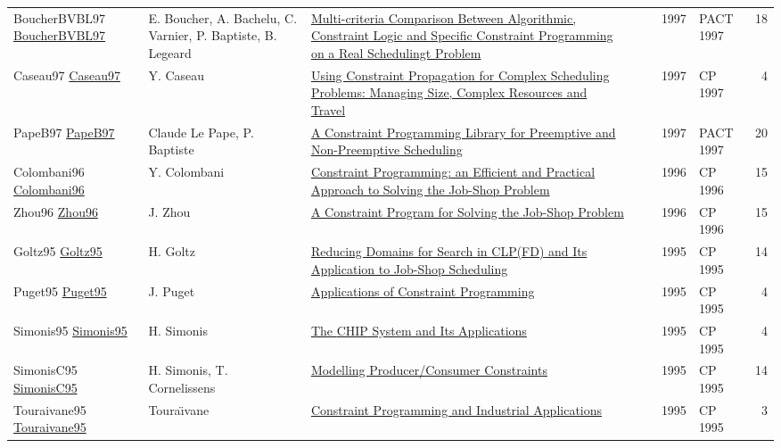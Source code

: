 {\begin{longtable}{p{3cm}p{6cm}p{7cm}rrrp{3cm}r}
BoucherBVBL97 \href{}{BoucherBVBL97} & E. Boucher, A. Bachelu, C. Varnier, P. Baptiste, B. Legeard & \href{}{Multi-criteria Comparison Between Algorithmic, Constraint Logic and Specific Constraint Programming on a Real Schedulingt Problem} &  & \cite{BoucherBVBL97} & 1997 & PACT 1997 & 18\\
Caseau97 \href{https://doi.org/10.1007/BFb0017437}{Caseau97} & Y. Caseau & \href{papers/Caseau97.pdf}{Using Constraint Propagation for Complex Scheduling Problems: Managing Size, Complex Resources and Travel} &  & \cite{Caseau97} & 1997 & CP 1997 & 4\\
PapeB97 \href{}{PapeB97} & Claude Le Pape, P. Baptiste & \href{}{A Constraint Programming Library for Preemptive and Non-Preemptive Scheduling} &  & \cite{PapeB97} & 1997 & PACT 1997 & 20\\
Colombani96 \href{https://doi.org/10.1007/3-540-61551-2\_72}{Colombani96} & Y. Colombani & \href{papers/Colombani96.pdf}{Constraint Programming: an Efficient and Practical Approach to Solving the Job-Shop Problem} &  & \cite{Colombani96} & 1996 & CP 1996 & 15\\
Zhou96 \href{https://doi.org/10.1007/3-540-61551-2\_97}{Zhou96} & J. Zhou & \href{papers/Zhou96.pdf}{A Constraint Program for Solving the Job-Shop Problem} &  & \cite{Zhou96} & 1996 & CP 1996 & 15\\
Goltz95 \href{https://doi.org/10.1007/3-540-60299-2\_33}{Goltz95} & H. Goltz & \href{papers/Goltz95.pdf}{Reducing Domains for Search in {CLP(FD)} and Its Application to Job-Shop Scheduling} &  & \cite{Goltz95} & 1995 & CP 1995 & 14\\
Puget95 \href{https://doi.org/10.1007/3-540-60299-2\_43}{Puget95} & J. Puget & \href{papers/Puget95.pdf}{Applications of Constraint Programming} &  & \cite{Puget95} & 1995 & CP 1995 & 4\\
Simonis95 \href{https://doi.org/10.1007/3-540-60299-2\_42}{Simonis95} & H. Simonis & \href{papers/Simonis95.pdf}{The {CHIP} System and Its Applications} &  & \cite{Simonis95} & 1995 & CP 1995 & 4\\
SimonisC95 \href{https://doi.org/10.1007/3-540-60299-2\_27}{SimonisC95} & H. Simonis, T. Cornelissens & \href{papers/SimonisC95.pdf}{Modelling Producer/Consumer Constraints} &  & \cite{SimonisC95} & 1995 & CP 1995 & 14\\
Touraivane95 \href{https://doi.org/10.1007/3-540-60299-2\_41}{Touraivane95} & Toura{\"{\i}}vane & \href{papers/Touraivane95.pdf}{Constraint Programming and Industrial Applications} &  & \cite{Touraivane95} & 1995 & CP 1995 & 3\\

\end{longtable}}

